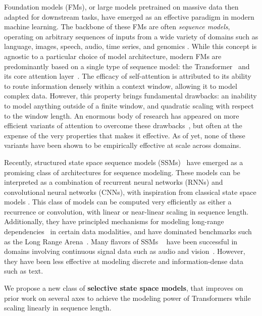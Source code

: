 Foundation models (FMs), or large models pretrained on massive data then adapted for downstream tasks, have emerged as an effective paradigm in modern machine learning. The backbone of these FMs are often
\emph{sequence models}, operating on arbitrary sequences of inputs from a wide variety of domains such as language, images, speech, audio, time series, and genomics
\citep{sutskever2014sequence,dosovitskiy2020image,oord2016wavenet,brown2020language,ismail2019deep,poli2023hyena}.
While this concept is agnostic to a particular choice of model architecture, modern FMs are predominantly based on a single type of sequence model: the Transformer~\citep{vaswani2017attention} and its core attention layer~\citep{bahdanau2015neural}.
The efficacy of self-attention is attributed to its ability to route information densely within a context window, allowing it to model complex data. However, this property brings fundamental drawbacks: an inability to model anything outside of a finite window, and quadratic scaling with respect to the window length. An enormous body of research has appeared on more efficient variants of attention to overcome these drawbacks~\citep{tay2022efficient},
but often at the expense of the very properties that makes it effective. As of yet, none of these variants have been shown to be empirically effective at scale across domains.

Recently, structured state space sequence models (SSMs)~\citep{gu2021combining,gu2022efficiently} have emerged as a promising class of architectures for sequence modeling. These models can be interpreted as a combination of recurrent neural networks (RNNs) and convolutional neural networks (CNNs), with inspiration from classical state space models \citep{kalman1960new}.
This class of models can be computed very efficiently as either a recurrence or convolution, with linear or near-linear scaling in sequence length. Additionally, they have principled mechanisms for modeling long-range dependencies~\citep{gu2020hippo} in certain data modalities, and have dominated benchmarks such as the Long Range Arena~\citep{tay2021long}.
Many flavors of SSMs ~\citep{gu2022efficiently,gupta2022diagonal,gu2022parameterization,li2023makes,ma2023mega,smith2023s5,orvieto2023resurrecting}
have been successful in domains involving continuous signal data such as audio and vision~\citep{goel2022raw,saon2023diagonal,nguyen2022s4nd}.
However, they have been less effective at modeling discrete and information-dense data such as text.

We propose a new class of \textbf{selective state space models}, that improves on prior work on several axes to achieve the modeling power of Transformers while scaling linearly in sequence length.

